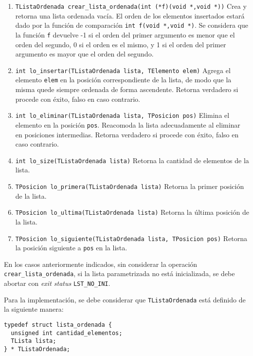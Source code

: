 \documentclass[12pt,a4paper]{article}
\begin{document}
\begin{enumerate}
	
	\item \texttt{TListaOrdenada crear\_lista\_ordenada(int (*f)(void *,void *))} Crea y retorna una lista ordenada vacía. El orden de los elementos insertados estará dado por la función de comparación \texttt{int f(void *,void *)}. Se considera que la función \texttt{f} devuelve -1 si el orden del primer argumento es menor que el orden del segundo, 0 si el orden es el mismo, y 1 si el orden del primer argumento es mayor que el orden del segundo.
	
	\item \texttt{int lo\_insertar(TListaOrdenada lista,  TElemento elem)} Agrega el elemento \texttt{elem} en la posición correspondiente de la lista, de modo que la misma quede siempre ordenada de forma ascendente. Retorna verdadero si procede con éxito, falso en caso contrario.
	
	\item \texttt{int lo\_eliminar(TListaOrdenada lista, TPosicion pos)} Elimina el elemento en la posición \texttt{pos}. Reacomoda la lista adecuadamente al eliminar en posiciones intermedias. Retorna verdadero si procede con éxito, falso en caso contrario.
	
	\item \texttt{int lo\_size(TListaOrdenada lista)} Retorna la cantidad de elementos de la lista.
	
	\item \texttt{TPosicion lo\_primera(TListaOrdenada lista)} Retorna la primer posición de la lista.
	
	\item \texttt{TPosicion lo\_ultima(TListaOrdenada lista)} Retorna la última posición de la lista.

	\item \texttt{TPosicion lo\_siguiente(TListaOrdenada lista, TPosicion pos)} Retorna la posición siguiente a \texttt{pos} en la lista.
	
\end{enumerate}

En los casos anteriormente indicados, sin considerar la operación \texttt{crear\_lista\_ordenada}, si la lista parametrizada no está inicializada, se debe abortar con \emph{exit status} \texttt{LST\_NO\_INI}.

Para la implementación, se debe considerar que \texttt{TListaOrdenada} está definido de la siguiente manera:

\begin{verbatim}
typedef struct lista_ordenada {
  unsigned int cantidad_elementos;
  TLista lista;
} * TListaOrdenada;
\end{verbatim}
\end{document}
